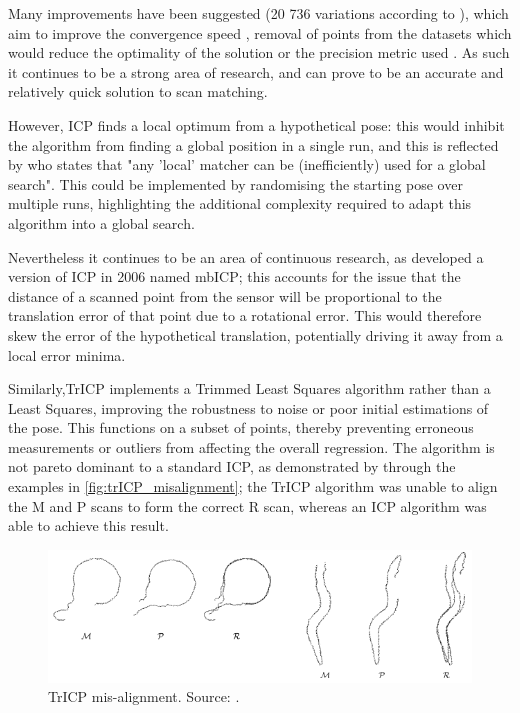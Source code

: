 \documentclass[authoryearcitations]{UoYCSproject}
\begin{document}
Many improvements have been suggested (20 736 variations according to \citet{Donoso2017-wp}), which aim to improve the convergence speed \cite{Donoso2017-wp} \cite{Simon1996-dl}, removal of points from the datasets which would reduce the optimality of the solution \cite{Weik1997-px} \cite{Masuda1996-av} or the precision metric used \cite{Eggert1997-ak}. As such it continues to be a strong area of research, and can prove to be an accurate and relatively quick solution to scan matching.\newline

However, ICP finds a local optimum from a hypothetical pose: this would inhibit the algorithm from finding a global position in a single run, and this is reflected by \citet{Censi2005-iv} who states that "any 'local' matcher can be (inefficiently) used for a global search". This could be implemented by randomising the starting pose over multiple runs, highlighting the additional complexity required to adapt this algorithm into a global search.\newline

Nevertheless it continues to be an area of continuous research, as \citet{Minguez2006-nj} developed a version of ICP in 2006 named mbICP;  this accounts for the issue that the distance of a scanned point from the sensor will be proportional to the translation error of that point due to a rotational error. This would therefore skew the error of the hypothetical translation, potentially driving it away from a local error minima.\newline

Similarly,TrICP \cite{Chetverikov2005-yz} implements a Trimmed Least Squares \cite{Ruppert1980-js} algorithm rather than a Least Squares, improving the robustness to noise or poor initial estimations of the pose. This functions on a subset of points, thereby preventing erroneous measurements or outliers from affecting the overall regression. The algorithm is not pareto dominant to a standard ICP, as demonstrated by \citeauthor{Chetverikov2005-yz} through the examples in \autoref{fig:trICP_misalignment}; the TrICP algorithm was unable to align the M and P scans to form the correct R scan, whereas an ICP algorithm was able to achieve this result. \newline


\begin{figure}[t]
	\centering
	\includegraphics[width=\textwidth,keepaspectratio]{images/trICP_misalignment.png}
	\caption[TrICP mis-alignment]{TrICP mis-alignment. Source: \citet{Chetverikov2005-yz}.}
	\label{fig:trICP_misalignment}
\end{figure}
\end{document}
